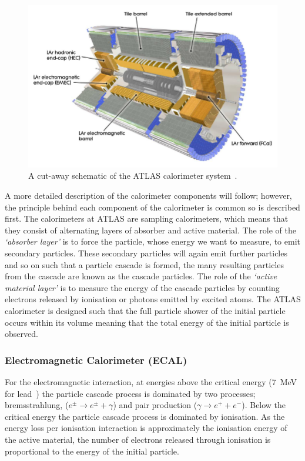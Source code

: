 \begin{figure}[!ht]
  \begin{center}
    \includegraphics[width=0.8\linewidth, angle=0]{figs/Detector/Calo_schem.png}
  \end{center}
  \caption[A cut-away schematic of the ATLAS calorimeter system.]
          {A cut-away schematic of the ATLAS calorimeter system~\cite{det-ATLAS_Exp}.}
  \label{fig:det-calo_schem}
\end{figure}

A more detailed description of the calorimeter components will follow;
however, the principle behind each component of the calorimeter is common so is described first.
The calorimeters at ATLAS are sampling calorimeters, which means that they consist of alternating layers of absorber and active material.
The role of the \textit{`absorber layer'} is to force the particle, whose energy we want to measure, to emit secondary particles.
These secondary particles will again emit further particles and so on such that a particle cascade is formed,
the many resulting particles from the cascade are known as the cascade particles.
The role of the \textit{`active material layer'} is to measure the energy of the cascade particles %
by counting electrons released by ionisation or photons emitted by excited atoms.
The ATLAS calorimeter is designed such that the full particle shower of the initial particle occurs within
its volume meaning that the total energy of the initial particle is observed.

\subsubsection{Electromagnetic Calorimeter (ECAL)}

For the electromagnetic interaction, at energies above the critical energy (\SI{7}{\MeV} for lead~\cite{obj-bjets_PDG})
the particle cascade process is dominated by two processes;
bremsstrahlung, ($e^{\pm} \to e^{\pm} + \gamma$) and pair production ($\gamma \to e^{+} + e^{-}$).
Below the critical energy the particle cascade process is dominated by ionisation.
As the energy loss per ionisation interaction is approximately the ionisation energy of the active material,
the number of electrons released through ionisation is proportional to the energy of the initial particle.

